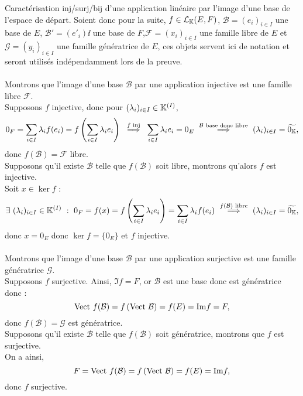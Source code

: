 \documentclass{article}
\renewenvironment{question_kholle}[2][ ]
{
	\subsection{\texorpdfstring{#2}{}}
	\notblank{#1}
	{
		\noindent #1
		\bigbreak
	}
	{}
	\begin{proof}
}
{
	\end{proof}
}
\begin{document}
\begin{question_kholle}
  {Caractérisation inj/surj/bij d'une application linéaire par l'image d'une base de l'espace de départ.}
  Soient donc pour la suite, $f \in \mathcal{L}_{\mathbb K}(E,F)$, $\mathcal{B} = (e_i)_{i\in I}$ une base de $E$, $\mathcal{B}' = (e'_i)\ii$ une base de $F$,$\mathcal{F} = (x_i)_{i\in I}$ une famille libre de $E$ et $\mathcal{G} = (y_i)_{i \in I}$ une famille génératrice de $E$, ces objets servent ici de notation et seront utilisés indépendamment lors de la preuve. \\ \\
  Montrons que l'image d'une base $\mathcal{B}$ par une application injective est une famille libre $\mathcal{F}$. \\
  Supposons $f$ injective, donc pour $(\lambda_i)_{i \in I} \in \mathbb K^{(I)}$,
  \[
    0_F = \sum_{i\in  I}\bda_i f(e_i) = f \left( \sum_{i\in  I} \bda_i e_i \right) \ \overset{f \text{ inj}}{\implies} \ \sum_{i\in  I} \bda_i e_i = 0_E \ \overset{\mathcal{B} \text{ base donc libre}}{\implies} \ (\bda _i)_{i\in  I} = \widetilde{0_\K},
  \]
  donc $f(\mathcal{B})= \mathcal{F}$ libre. \\
  Supposons qu'il existe $\mathcal{B}$ telle que $f(\mathcal{B})$ soit libre, montrons qu'alors $f$ est injective. \\
  Soit $x \in \ker f$ :
  \[
    \exists \ (\lambda_i)_{i \in I} \in \mathbb K^{(I)} \ : \ 0_F = f(x) = f\left( \sum_{i \in I} \lambda_i e_i \right) =\sum _{i \in I} \lambda _i f(e_i) \  \overset{f(\mathcal{B}) \text{ libre}}{\implies} \ (\lambda _i)_{i\in  I} = \widetilde{0_{\mathbb K}},
  \]
  donc $x = 0_E$ donc $\ker f = \{0_E\}$ et $f$ injective. \\ \\
  Montrons que l'image d'une base $\mathcal{B}$ par une application surjective est une famille génératrice $\mathcal{G}$. \\
  Supposons $f$ surjective. Ainsi, $\Im f = F$, or $\mathcal{B}$ est une base donc est génératrice donc :
  \[
    \text{Vect } f(\mathcal{B}) = f\left( \text{Vect } \mathcal{B} \right) = f( E) = \text{Im} f = F,
  \]
  donc $f(\mathcal{B}) = \mathcal{G}$ est génératrice. \\
  Supposons qu'il existe $\mathcal{B}$ telle que $f(\mathcal{B})$ soit génératrice, montrons que $f$ est surjective. \\
  On a ainsi,
  \[
    F = \text{Vect } f(\mathcal{B}) = f \left( \text{Vect } \mathcal{B} \right) = f(E) = \text{Im} f,
  \]
  donc $f$ surjective. \\ \\

\end{question_kholle}
\end{document}
